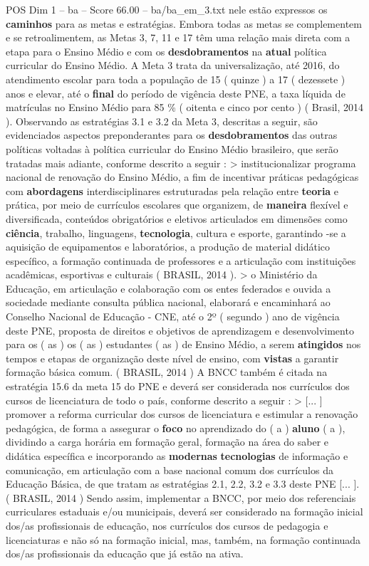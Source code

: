 \begin{textsample}{POS Dim 1 – ba – Score 66.00 – ba/ba\_em\_3.txt}
nele estão expressos os \textbf{caminhos} para as metas e estratégias.
Embora todas as metas se complementem e se retroalimentem, as Metas 3, 7, 11 e 17 têm uma relação mais direta com a etapa para o Ensino Médio e com os \textbf{desdobramentos} na \textbf{atual} política curricular do Ensino Médio.
A Meta 3 trata da universalização, até 2016, do atendimento escolar para toda a população de 15 ( quinze ) a 17 ( dezessete ) anos e elevar, até o \textbf{final} do período de vigência deste PNE, a taxa líquida de matrículas no Ensino Médio para 85 \% ( oitenta e cinco por cento ) ( Brasil, 2014 ).
Observando as estratégias 3.1 e 3.2 da Meta 3, descritas a seguir, são evidenciados aspectos preponderantes para os \textbf{desdobramentos} das outras políticas voltadas à política curricular do Ensino Médio brasileiro, que serão tratadas mais adiante, conforme descrito a seguir : > institucionalizar programa nacional de renovação do Ensino Médio, a fim de incentivar práticas pedagógicas com \textbf{abordagens} interdisciplinares estruturadas pela relação entre \textbf{teoria} e prática, por meio de currículos escolares que organizem, de \textbf{maneira} flexível e diversificada, conteúdos obrigatórios e eletivos articulados em dimensões como \textbf{ciência}, trabalho, linguagens, \textbf{tecnologia}, cultura e esporte, garantindo -se a aquisição de equipamentos e laboratórios, a produção de material didático específico, a formação continuada de professores e a articulação com instituições acadêmicas, esportivas e culturais ( BRASIL, 2014 ). > o Ministério da Educação, em articulação e colaboração com os entes federados e ouvida a sociedade mediante consulta pública nacional, elaborará e encaminhará ao Conselho Nacional de Educação - CNE, até o 2º ( segundo ) ano de vigência deste PNE, proposta de direitos e objetivos de aprendizagem e desenvolvimento para os ( as ) os ( as ) estudantes ( as ) de Ensino Médio, a serem \textbf{atingidos} nos tempos e etapas de organização deste nível de ensino, com \textbf{vistas} a garantir formação básica comum. ( BRASIL, 2014 ) A BNCC também é citada na estratégia 15.6 da meta 15 do PNE e deverá ser considerada nos currículos dos cursos de licenciatura de todo o país, conforme descrito a seguir : > [... ] promover a reforma curricular dos cursos de licenciatura e estimular a renovação pedagógica, de forma a assegurar o \textbf{foco} no aprendizado do ( a ) \textbf{aluno} ( a ), dividindo a carga horária em formação geral, formação na área do saber e didática específica e incorporando as \textbf{modernas} \textbf{tecnologias} de informação e comunicação, em articulação com a base nacional comum dos currículos da Educação Básica, de que tratam as estratégias 2.1, 2.2, 3.2 e 3.3 deste PNE [... ]. ( BRASIL, 2014 ) Sendo assim, implementar a BNCC, por meio dos referenciais curriculares estaduais e/ou municipais, deverá ser considerado na formação inicial dos/as profissionais de educação, nos currículos dos cursos de pedagogia e licenciaturas e não só na formação inicial, mas, também, na formação continuada dos/as profissionais da educação que já estão na ativa.

\end{textsample}
